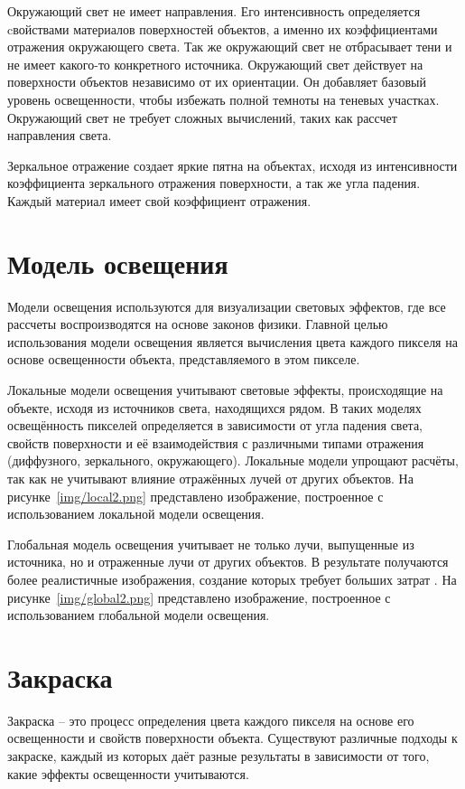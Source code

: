 Окружающий свет не имеет направления. Его интенсивность определяется cвойствами материалов поверхностей объектов, а именно их коэффициентами отражения окружающего света.
Так же окружающий свет не отбрасывает тени и не имеет какого-то конкретного источника.
Окружающий свет действует на поверхности объектов независимо от их ориентации. Он добавляет базовый уровень освещенности, чтобы избежать полной темноты на теневых участках. Окружающий свет не требует сложных вычислений, таких как рассчет направления света.
 
Зеркальное отражение создает яркие пятна на объектах, исходя из интенсивности коэффициента зеркального отражения поверхности, а так же угла падения.
Каждый материал имеет свой коэффициент отражения.

\section{Модель освещения}
Модели освещения используются для визуализации световых эффектов, где все рассчеты воспроизводятся на основе законов физики. Главной целью использования модели освещения является вычисления цвета каждого пикселя на основе освещенности объекта, представляемого в этом пикселе.

Локальные модели освещения учитывают световые эффекты, происходящие на объекте, исходя из источников света, находящихся рядом. В таких моделях освещённость пикселей определяется в зависимости от угла падения света, свойств поверхности и её взаимодействия с различными типами отражения (диффузного, зеркального, окружающего). Локальные модели упрощают расчёты, так как не учитывают влияние отражённых лучей от других объектов. На рисунке~\ref{img/local2.png} представлено изображение, построенное с использованием локальной модели освещения.


Глобальная модель освещения учитывает не только лучи, выпущенные из источника, но и отраженные лучи от других объектов. В результате получаются более реалистичные изображения, создание которых требует больших затрат \cite{pharr}. На рисунке~\ref{img/global2.png} представлено изображение, построенное с использованием глобальной модели освещения.


\section{Закраска} Закраска -- это процесс определения цвета каждого пикселя на основе его освещенности и свойств поверхности объекта. Существуют различные подходы к закраске, каждый из которых даёт разные результаты в зависимости от того, какие эффекты освещенности учитываются.

